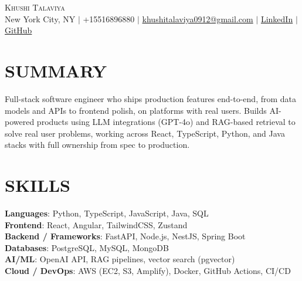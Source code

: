 \documentclass[letterpaper,11pt]{article}
\begin{document}
\begin{center}
    {\Huge \scshape Khushi Talaviya} \\ \vspace{2pt}
    \vspace{4pt}
    \small
    New York City, NY $|$
    \small
    +15516896880 $|$
    \href{mailto:khushitalaviya0912@gmail.com}{khushitalaviya0912@gmail.com} $|$
    \href{https://www.linkedin.com/in/khushitalaviya/}{LinkedIn} $|$
    \href{https://github.com/talaviyakhushi}{GitHub}
\end{center}

\section{SUMMARY}
\vspace{5pt}
\small{Full-stack software engineer who ships production features end-to-end, from data models and APIs to frontend polish, on platforms with real users. Builds AI-powered products using LLM integrations (GPT-4o) and RAG-based retrieval to solve real user problems, working across React, TypeScript, Python, and Java stacks with full ownership from spec to production.}

\vspace{2pt}
\section{SKILLS}
\vspace{5pt}
\begin{itemize}[leftmargin=0in, label={}]
\small{\item{
\textbf{Languages}{: Python, TypeScript, JavaScript, Java, SQL} \\
\textbf{Frontend}{: React, Angular, TailwindCSS, Zustand} \\
\textbf{Backend / Frameworks}{: FastAPI, Node.js, NestJS, Spring Boot} \\
\textbf{Databases}{: PostgreSQL, MySQL, MongoDB} \\
\textbf{AI/ML}{: OpenAI API, RAG pipelines, vector search (pgvector)} \\
\textbf{Cloud / DevOps}{: AWS (EC2, S3, Amplify), Docker, GitHub Actions, CI/CD}
}}
\end{itemize}
\vspace{-10pt}

\end{document}
